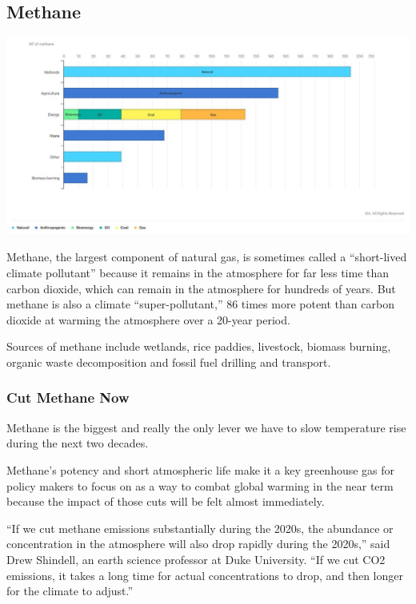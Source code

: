 \documentclass[
]{book}
\begin{document}
\hypertarget{methane}{%
\subsection{Methane}\label{methane}}

\includegraphics{fig/Methane_by_Source.jpeg}

Methane, the largest component of natural gas, is sometimes called a ``short-lived climate pollutant'' because it remains in the atmosphere for far less time than carbon dioxide, which can remain in the atmosphere for hundreds of years. But methane is also a climate ``super-pollutant,'' 86 times more potent than carbon dioxide at warming the atmosphere over a 20-year period.

Sources of methane include wetlands, rice paddies, livestock, biomass burning, organic waste decomposition and fossil fuel drilling and transport.

\hypertarget{cut-methane-now}{%
\subsubsection{Cut Methane Now}\label{cut-methane-now}}

Methane is the biggest and really the only lever we have to slow
temperature rise during the next two decades.

Methane's potency and short atmospheric life make it a key greenhouse gas for policy makers to focus on as a way to combat global warming in the near term because the impact of those cuts will be felt almost immediately.

``If we cut methane emissions substantially during the 2020s, the abundance or concentration in the atmosphere will also drop rapidly during the 2020s,'' said Drew Shindell, an earth science professor at Duke University. ``If we cut CO2 emissions, it takes a long time for actual concentrations to drop, and then longer for the climate to adjust.''
\end{document}

